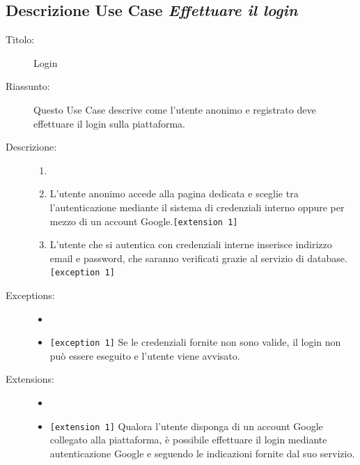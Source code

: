 \documentclass[11pt, a4paper]{article}
\theoremstyle{definition} %
\begin{document}
\newpage
\subsection*{Descrizione Use Case \textit{Effettuare il login}}
\begin{description}
    \item[Titolo:] Login
    
    \item[Riassunto:] Questo Use Case descrive come l'utente anonimo e registrato deve
    effettuare il login sulla piattaforma.

    \item[Descrizione:]
    \begin{enumerate}
        \item[]
        \item L'utente anonimo accede alla pagina dedicata e sceglie tra l'autenticazione mediante il sistema di credenziali interno oppure per mezzo di un account Google.\texttt{[extension 1]}
        \item L'utente che si autentica con credenziali interne inserisce indirizzo email e password, che saranno verificati grazie al servizio di database.\texttt{[exception 1]}
    \end{enumerate}
    
    \item[Exceptions:]
    \begin{itemize}
        \item[]
        \item \verb|[exception 1]| Se le credenziali fornite non sono valide, il login non può essere eseguito e l'utente viene avvisato.
    \end{itemize}

    \item[Extensions:]
    \begin{itemize}
        \item[]
        \item \texttt{[extension 1]} Qualora l'utente disponga di un account Google collegato alla piattaforma, è possibile effettuare il login
        mediante autenticazione Google e seguendo le indicazioni fornite dal suo servizio.
    \end{itemize}
\end{description}
\end{document}
